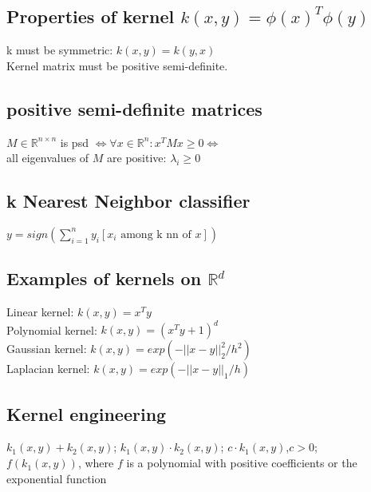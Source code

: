 \subsection*{Properties of kernel $k(x,y) = \phi(x)^T\phi(y)$}
k must be symmetric: $k(x,y) = k(y,x)$\\
Kernel matrix must be positive semi-definite.


\subsection*{positive semi-definite matrices}
$M \in \mathbb{R}^{n\times n}$ is psd $\Leftrightarrow \forall x \in \mathbb{R}^n: x^TMx \geq 0 \Leftrightarrow$\\
all eigenvalues of $M$ are positive: $\lambda_i\geq 0$

\subsection*{k Nearest Neighbor classifier}
$y=sign(\sum_{i=1}^n y_i [x_i \text{ among k nn of } x])$

\subsection*{Examples of kernels on $\mathbb{R}^d$}
Linear kernel: $k(x,y)=x^T y$\\
Polynomial kernel: $k(x,y)=(x^T y + 1)^d$\\
Gaussian kernel: $k(x,y) = exp(-||x-y||_2^2/h^2)$\\
Laplacian kernel: $k(x,y) = exp(-||x-y||_1/h)$


\subsection*{Kernel engineering}
$k_1(x,y) + k_2(x,y)$; $k_1(x,y) \cdot k_2(x,y)$; $c \cdot k_1(x,y)$,$c>0$;\\
$f(k_1(x,y))$, where $f$ is a polynomial with positive coefficients or the exponential function

